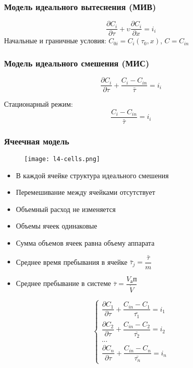 \begin{frame}
	\frametitle{Модель идеального вытеснения (МИВ)}
	\begin{equation}
		\dfrac{ \partial C_i } { \partial \tau } + \upsilon \dfrac { \partial C_i } { \partial x } = i_i
	\end{equation}
	Начальные и граничные условия:
	$C_{0i} = C_i( \tau_0 , x )$, $C=C_{in}$
	
	
\end{frame}

\begin{frame}
	\frametitle{Модель идеального смешения (МИС)}

	\begin{equation}
	\dfrac { \partial C_i }  { \partial \tau } + \dfrac {C_i - C_{in}} { \bar{\tau} } = i_i
	\end{equation}
	
	Стационарный режим:
	\begin{equation}
		\dfrac {C_i - C_{in}} { \bar{\tau} } = i_i
	\end{equation}
		
\end{frame}

\begin{frame}
	\frametitle{Ячеечная модель}
	\begin{figure}[h]
		\texttt{[image: l4-cells.png]}
	\end{figure}
	
	\begin{itemize}
		\item В каждой ячейке структура идеального смешения
		\item Перемешивание между ячейками отсутствует
		\item Объемный расход не изменяется
		\item Объемы ячеек одинаковые
		\item Сумма объемов ячеек равна объему аппарата
		\item Среднее время пребывания в ячейке $\bar{\tau}_j = \dfrac{\bar{\tau}} {m}  $
		\item Среднее пребывание в системе $\bar{\tau} =\dfrac{ V_ап } { \dot{V} }$
	\end{itemize}
	
\end{frame}

\begin{frame}
	\begin{equation}
	\left\lbrace 
	\begin{gathered} 
	\dfrac { \partial C_1 } {\partial \tau} + \dfrac{C_{in} - C_1} {\bar{\tau_1}} =i_1  \\
	\dfrac { \partial C_2 } {\partial \tau} + \dfrac{C_{in} - C_2} {\bar{\tau_2}} =i_2 \\
	... \\
	\dfrac { \partial C_n } {\partial \tau} + \dfrac{C_{in} - C_n} {\bar{\tau_n}} =i_n
	\end{gathered} 
	\right.
	\end{equation}
\end{frame}

